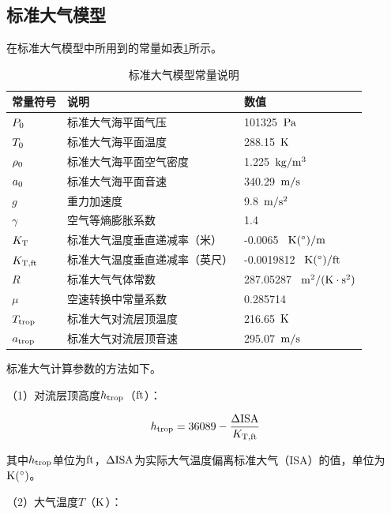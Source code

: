 \documentclass[a4paper,punct,space,heading=true,AutoFakeBold]{ctexrep}
\begin{document}
\subsection{标准大气模型}

在标准大气模型中所用到的常量如表\ref{constantsInAtmosphereEnviroment}所示。

\begin{table}[!ht]
	\caption{标准大气模型常量说明}\label{constantsInAtmosphereEnviroment}
	\begin{tabular*}{\hsize}{@{}@{\extracolsep{\fill}}lll@{}}
		\toprule[1.5pt]
		常量符号  &说明  &数值\\
		\midrule[0.5pt]
		$P_{\rm 0}$  &标准大气海平面气压   &101325\ $\rm Pa$\\
		$T_{\rm 0}$  &标准大气海平面温度  &288.15\ $\rm K$\\
		$\rho_{\rm 0}$  &标准大气海平面空气密度 &1.225\ $\rm kg/m^3$\\
		$a_{\rm 0}$  &标准大气海平面音速  &340.29\ $\rm m/s$\\
		$g$  &重力加速度  &9.8\ $\rm m/s^2$\\
		$\gamma$  &空气等熵膨胀系数  &1.4\\
		$K_{\rm T}$  &标准大气温度垂直递减率（米）  &-0.0065 \ $\rm K(^\circ)/m$\\
		$K_{\rm T,ft}$  &标准大气温度垂直递减率（英尺） &-0.0019812 \ $\rm K(^\circ)/ft$\\
		$R$  &标准大气气体常数 &287.05287 \ $\rm m^2/(K\cdot s^2)$\\
		$\mu$  &空速转换中常量系数 &0.285714\\
		$T_{\rm trop}$  &标准大气对流层顶温度 &216.65\ $\rm K$\\
		$a_{\rm trop}$  &标准大气对流层顶音速 &295.07\ $\rm m/s$\\
		\bottomrule[1.5pt]
	\end{tabular*}
\end{table}

标准大气计算参数的方法如下。

（1）对流层顶高度$h_{\rm trop}$（$\rm ft$）：

\begin{equation}\label{htrop}
h_{\rm trop}=36089-\frac{\Delta \rm ISA}{K_{\rm T,ft}}
\end{equation}

其中$h_{\rm trop}$单位为$\rm ft$，$\Delta \rm ISA$为实际大气温度偏离标准大气（ISA）的值，单位为$\rm K(^\circ)$。

（2）大气温度$T$（$\rm K$）：
\end{document}
